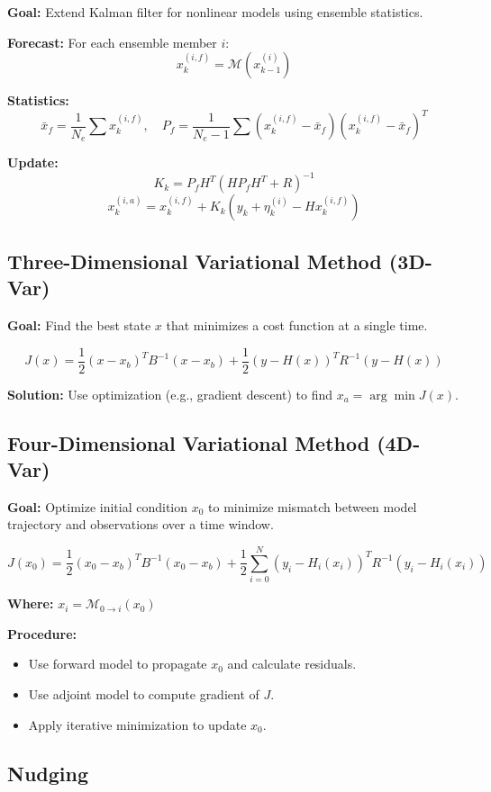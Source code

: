\documentclass[a4paper]{article}
\begin{document}
\textbf{Goal:} Extend Kalman filter for nonlinear models using ensemble statistics.

\textbf{Forecast:} For each ensemble member $i$:
\[
x_k^{(i,f)} = \mathcal{M}(x_{k-1}^{(i)})
\]

\textbf{Statistics:}
\[
\bar{x}_f = \frac{1}{N_e} \sum x_k^{(i,f)}, \quad
P_f = \frac{1}{N_e - 1} \sum (x_k^{(i,f)} - \bar{x}_f)(x_k^{(i,f)} - \bar{x}_f)^T
\]

\textbf{Update:}
\[
K_k = P_f H^T (H P_f H^T + R)^{-1}
\]
\[
x_k^{(i,a)} = x_k^{(i,f)} + K_k \left(y_k + \eta_k^{(i)} - H x_k^{(i,f)} \right)
\]

\subsection{Three-Dimensional Variational Method (3D-Var)}

\textbf{Goal:} Find the best state $x$ that minimizes a cost function at a single time.

\[
J(x) = \frac{1}{2}(x - x_b)^T B^{-1}(x - x_b) + \frac{1}{2}(y - H(x))^T R^{-1} (y - H(x))
\]

\textbf{Solution:} Use optimization (e.g., gradient descent) to find $x_a = \arg\min J(x)$.

\subsection{Four-Dimensional Variational Method (4D-Var)}

\textbf{Goal:} Optimize initial condition $x_0$ to minimize mismatch between model trajectory and observations over a time window.

\[
J(x_0) = \frac{1}{2}(x_0 - x_b)^T B^{-1}(x_0 - x_b) + \frac{1}{2} \sum_{i=0}^{N} (y_i - H_i(x_i))^T R^{-1} (y_i - H_i(x_i))
\]

\textbf{Where:} $x_i = \mathcal{M}_{0 \rightarrow i}(x_0)$

\textbf{Procedure:}
\begin{itemize}
  \item Use forward model to propagate $x_0$ and calculate residuals.
  \item Use adjoint model to compute gradient of $J$.
  \item Apply iterative minimization to update $x_0$.
\end{itemize}

\subsection{Nudging}
\end{document}

